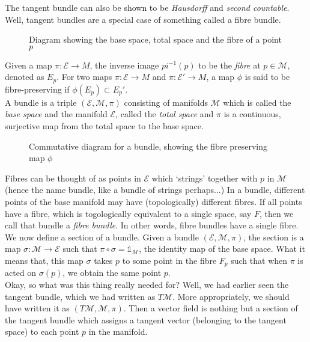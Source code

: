 The tangent bundle can also be shown to be \textit{Hausdorff} and \textit{second countable}. Well, tangent bundles are a special case of something called a fibre bundle. 
\begin{figure}[H]
  \centering 
  
  \caption{Diagram showing the base space, total space and the fibre of a point $p$}
\end{figure}
\begin{definition}[Bundle]
  Given a map $\pi: \mathcal{E}\rightarrow M$, the inverse image $pi^{-1}(p)$ to be the \textit{fibre} at $p\in \mathcal{M}$, denoted as $E_p$. For two maps $\pi: \mathcal{E}\rightarrow M$ and $\pi: \mathcal{E}'\rightarrow M$, a map $\phi$ is said to be fibre-preserving if $\phi(E_p)\subset E_p'$.\\[0.2cm]
  A bundle is a triple $(\mathcal{E},\mathcal{M},\pi)$ consisting of manifolds $\mathcal{M}$ which is called the \textit{base space} and the manifold $\mathcal{E}$, called the \textit{total space} and $\pi$ is a continuous, surjective map from the total space to the base space.  
\end{definition}

\begin{figure}[H]
  \centering 
  
  \caption{Commutative diagram for a bundle, showing the fibre preserving map $\phi$}
\end{figure}
\noindent
Fibres can be thought of as points in $\mathcal{E}$ which `strings' together with $p$ in $\mathcal{M}$ (hence the name bundle, like a bundle of strings perhaps...) In a bundle, different points of the base manifold may have (topologically) different fibres. If all points have a fibre, which is togologically equivalent to a single space, say $F$, then we call that bundle a \textit{fibre bundle}. In other words, fibre bundles have a single fibre. \\[0.3cm]
We now define a section of a bundle. Given a bundle $(\mathcal{E}, \mathcal{M}, \pi)$, the section is a map $\sigma: \mathcal{M}\rightarrow \mathcal{E}$ such that $\pi \circ \sigma = \mathds{1}_\mathcal{M}$, the identity map of the base space. What it means that, this map $\sigma$ takes $p$ to some point in the fibre $F_p$ such that when $\pi$ is acted on $\sigma(p)$, we obtain the same point $p$.\\[0.2cm]
Okay, so what was this thing really needed for? Well, we had earlier seen the tangent bundle, which we had written as $T\mathcal{M}$. More appropriately, we should have written it as $(T\mathcal{M}, \mathcal{M}, \pi)$. Then a vector field is nothing but a section of the tangent bundle which assigns a tangent vector (belonging to the tangent space) to each point $p$ in the manifold.